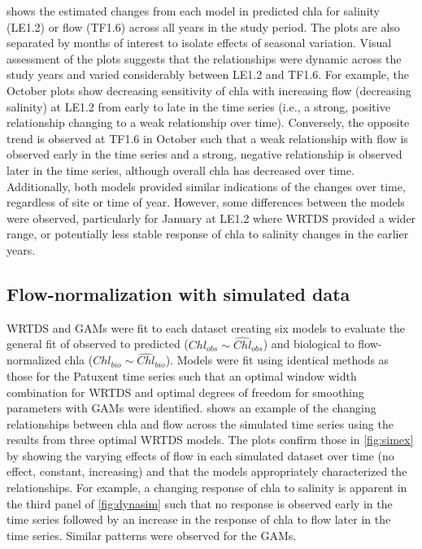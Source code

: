 \documentclass[letterpaper,12pt,oneside]{article}\usepackage[]{graphicx}\usepackage[]{color}
\begin{document}
 shows the estimated changes from each model in predicted \ac{chla} for salinity (LE1.2) or flow (TF1.6) across all years in the study period.  The plots are also separated by months of interest to isolate effects of seasonal variation.  Visual assessment of the plots suggests that the relationships were dynamic across the study years and varied considerably between LE1.2 and TF1.6.  For example, the October plots show decreasing sensitivity of \ac{chla} with increasing flow (decreasing salinity) at LE1.2 from early to late in the time series (i.e., a strong, positive relationship changing to a weak relationship over time).  Conversely, the opposite trend is observed at TF1.6 in October such that a weak relationship with flow is observed early in the time series and a strong, negative relationship is observed later in the time series, although overall \ac{chla} has decreased over time.  Additionally, both models provided similar indications of the changes over time, regardless of site or time of year.  However, some differences between the models were observed, particularly for January at LE1.2 where \ac{WRTDS} provided a wider range, or potentially less stable response of \ac{chla} to salinity changes in the earlier years.

\subsection{Flow-normalization with simulated data}

\ac{WRTDS} and \acp{GAM} were fit to each dataset creating six models to evaluate the general fit of observed to predicted ($Chl_{obs} \sim \widehat{Chl}_{obs}$) and biological to flow-normalized \ac{chla} ($Chl_{bio} \sim \widehat{Chl}_{bio}$).  Models were fit using identical methods as those for the Patuxent time series such that an optimal window width combination for \ac{WRTDS} and optimal degrees of freedom for smoothing parameters with \acp{GAM} were identified.   shows an example of the changing relationships between \ac{chla} and flow across the simulated time series using the results from three optimal \ac{WRTDS} models.  The plots confirm those in \cref{fig:simex} by showing the varying effects of flow in each simulated dataset over time (no effect, constant, increasing) and that the models appropriately characterized the relationships.  For example, a changing response of \ac{chla} to salinity is apparent in the third panel of \cref{fig:dynasim} such that no response is observed early in the time series followed by an increase in the response of \ac{chla} to flow later in the time series.  Similar patterns were observed for the \acp{GAM}.
\end{document}
